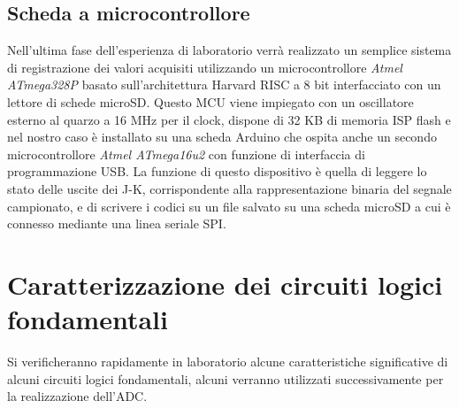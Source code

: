 \documentclass[journal]{IEEEtran}
\begin{document}
\subsection{Scheda a microcontrollore}
Nell'ultima fase dell'esperienza di laboratorio verrà realizzato un semplice sistema di registrazione dei valori acquisiti utilizzando un microcontrollore \textit{Atmel ATmega328P} basato sull'architettura Harvard RISC a 8 bit interfacciato con un lettore di schede microSD. Questo MCU viene impiegato con un oscillatore esterno al quarzo a 16 MHz per il clock, dispone di 32 KB di memoria ISP flash e nel nostro caso è installato su una scheda Arduino che ospita anche un secondo microcontrollore \textit{Atmel ATmega16u2} con funzione di interfaccia di programmazione USB. La funzione di questo dispositivo è quella di leggere lo stato delle uscite dei J-K, corrispondente alla rappresentazione binaria del segnale campionato, e di scrivere i codici su un file salvato su una scheda microSD a cui è connesso mediante una linea seriale SPI.


\section{Caratterizzazione dei circuiti logici fondamentali}
Si verificheranno rapidamente in laboratorio alcune caratteristiche significative di alcuni circuiti logici fondamentali, alcuni verranno utilizzati successivamente per la realizzazione dell'ADC.
\end{document}
